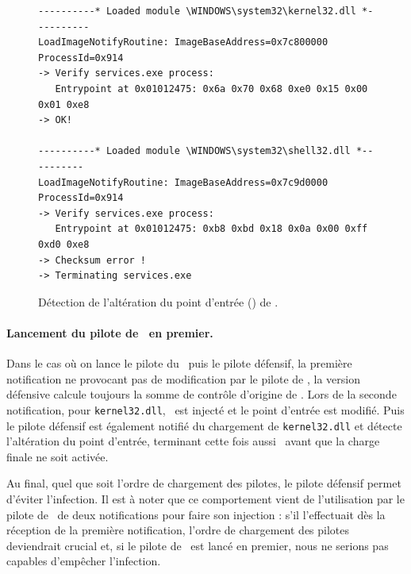 \begin{figure}[h]
\begin{center}
\scriptsize
\begin{lstlisting}[language={}]
----------* Loaded module \WINDOWS\system32\kernel32.dll *----------
LoadImageNotifyRoutine: ImageBaseAddress=0x7c800000 ProcessId=0x914 
-> Verify services.exe process: 
   Entrypoint at 0x01012475: 0x6a 0x70 0x68 0xe0 0x15 0x00 0x01 0xe8
-> OK!

----------* Loaded module \WINDOWS\system32\shell32.dll *----------
LoadImageNotifyRoutine: ImageBaseAddress=0x7c9d0000 ProcessId=0x914 
-> Verify services.exe process:
   Entrypoint at 0x01012475: 0xb8 0xbd 0x18 0x0a 0x00 0xff 0xd0 0xe8
-> Checksum error !
-> Terminating services.exe
\end{lstlisting}
\end{center}
\caption{Détection de l'altération du point d'entrée () de \services.\label{fig:Breakpoint2}}
\end{figure}

\paragraph{Lancement du pilote de \duqu\ en premier.}
Dans le cas où on lance le pilote du \duqu\ puis le pilote défensif, la première notification ne provocant pas de modification par le pilote de \duqu, la version défensive calcule toujours la somme de contrôle d'origine de \services.
Lors de la seconde notification, pour \texttt{kernel32.dll}, \duqu\ est injecté et le point d'entrée est modifié. Puis le pilote défensif est également notifié du chargement de \texttt{kernel32.dll} et détecte l'altération du point d'entrée, terminant cette fois aussi \services\ avant que la charge finale ne soit activée.

Au final, quel que soit l'ordre de chargement des pilotes, le pilote défensif permet d'éviter l'infection.
Il est à noter que ce comportement vient de l'utilisation par le pilote de \duqu\ de deux notifications pour faire son injection : s'il l'effectuait dès la réception de la première notification, l'ordre de chargement des pilotes deviendrait crucial et, si le pilote de \duqu\ est lancé en premier, nous ne serions pas capables d'empêcher l'infection.

